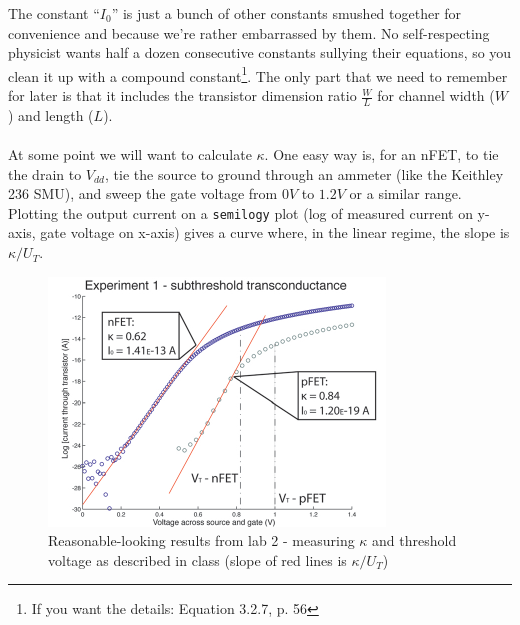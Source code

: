 \documentclass[main]{subfiles}
\begin{document}
The constant ``$I_0$'' is just a bunch of other constants smushed together for convenience and because we're rather embarrassed by them. No self-respecting physicist wants half a dozen consecutive constants sullying their equations, so you clean it up with a compound constant\footnote{If you want the details: Equation 3.2.7, p. 56}. The only part that we need to remember for later is that it includes the transistor dimension ratio $\frac{W}{L}$ for channel width ($W$) and length ($L$).\\ \\
At some point we will want to calculate $\kappa$. One easy way is, for an nFET, to tie the drain to $V_{dd}$, tie the source to ground through an ammeter (like the Keithley 236 SMU), and sweep the gate voltage from $0V$ to $1.2V$ or a similar range. Plotting the output current on a \texttt{semilogy} plot (log of measured current on y-axis, gate voltage on x-axis) gives a curve where, in the linear regime, the slope is $\kappa/U_T$.
\begin{figure}[H]
\centering
\includegraphics[width=0.6\linewidth]{figs/nme_lab2exp1.pdf}
\caption{Reasonable-looking results from lab 2 - measuring $\kappa$ and threshold voltage as described in class (slope of red lines is $\kappa/U_T$) \label{lab2exp1}}
\end{figure}
\end{document}
